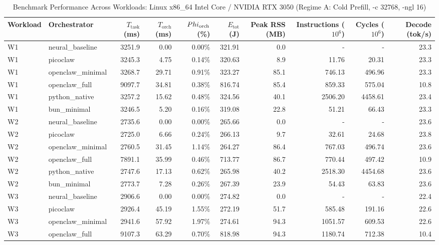 \begin{table}[t]
\centering\small
\caption{Benchmark Performance Across Workloads: Linux x86_64 Intel Core / NVIDIA RTX 3050 (Regime A: Cold Prefill, -c 32768, -ngl 16)}
\label{tab:linux_master_summary}
\begin{tabular}{llrrrrrrrr}
\toprule
Workload & Orchestrator & $T_{\text{task}}$ (ms) & $T_{\text{orch}}$ (ms) & $\\Phi_{\text{orch}}$ (\%) & $E_{\text{tot}}$ (J) & Peak RSS (MB) & Instructions ($10^6$) & Cycles ($10^6$) & Decode (tok/s) \\
\midrule
W1 & neural\_baseline & 3251.9 & 0.00 & 0.00\% & 321.91 & 0.0 & - & - & 23.3 \\
W1 & picoclaw & 3245.3 & 4.75 & 0.14\% & 320.63 & 8.9 & 11.76 & 20.31 & 23.3 \\
W1 & openclaw\_minimal & 3268.7 & 29.71 & 0.91\% & 323.27 & 85.1 & 746.13 & 496.96 & 23.3 \\
W1 & openclaw\_full & 9097.7 & 34.81 & 0.38\% & 816.74 & 85.4 & 859.33 & 575.04 & 10.8 \\
W1 & python\_native & 3257.2 & 15.62 & 0.48\% & 324.56 & 40.1 & 2506.20 & 4458.61 & 23.4 \\
W1 & bun\_minimal & 3246.5 & 5.20 & 0.16\% & 319.08 & 22.8 & 51.21 & 66.43 & 23.3 \\
\midrule
W2 & neural\_baseline & 2735.6 & 0.00 & 0.00\% & 265.66 & 0.0 & - & - & 23.6 \\
W2 & picoclaw & 2725.0 & 6.66 & 0.24\% & 266.13 & 9.7 & 32.61 & 24.68 & 23.8 \\
W2 & openclaw\_minimal & 2760.5 & 31.45 & 1.14\% & 264.27 & 86.4 & 767.03 & 496.74 & 23.6 \\
W2 & openclaw\_full & 7891.1 & 35.99 & 0.46\% & 713.77 & 86.7 & 770.44 & 497.42 & 10.9 \\
W2 & python\_native & 2747.6 & 17.13 & 0.62\% & 265.98 & 40.2 & 2518.30 & 4454.68 & 23.6 \\
W2 & bun\_minimal & 2773.7 & 7.28 & 0.26\% & 267.39 & 23.9 & 54.43 & 63.83 & 23.6 \\
\midrule
W3 & neural\_baseline & 2906.6 & 0.00 & 0.00\% & 274.82 & 0.0 & - & - & 22.4 \\
W3 & picoclaw & 2926.4 & 45.19 & 1.55\% & 272.19 & 51.7 & 585.48 & 191.16 & 22.6 \\
W3 & openclaw\_minimal & 2941.6 & 57.92 & 1.97\% & 274.61 & 94.3 & 1051.57 & 609.53 & 22.6 \\
W3 & openclaw\_full & 9107.3 & 63.29 & 0.70\% & 818.98 & 94.3 & 1180.74 & 712.38 & 10.4 \\

\end{tabular}
\end{table}
